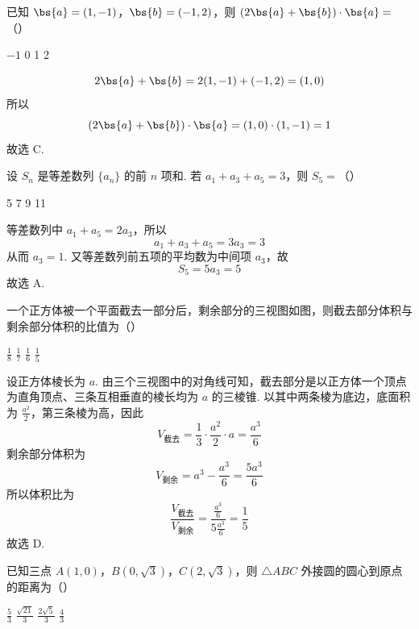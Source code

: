 \begin{problem}
已知 \(\bs{a} = (1, -1)\)，\(\bs{b} = (-1, 2)\)，则 \((2\bs{a} + \bs{b}) \cdot \bs{a} =\)（\quad）

\choices
    {\(-1\)}
    {0}
    {1}
    {2}
\end{problem}


\begin{solution}
\[
2\bs{a}+\bs{b}=2(1,-1)+(-1,2)=(1,0)
\]
所以
\[
(2\bs{a}+\bs{b})\cdot\bs{a}=(1,0)\cdot(1,-1)=1
\]
故选 C.
\end{solution}

\begin{problem}
设 \(S_{n}\) 是等差数列 \(\{a_{n}\}\) 的前 \(n\) 项和. 若 \(a_{1} + a_{3} + a_{5} = 3\)，则 \(S_{5} =\)（\quad）

\choices
    {5}
    {7}
    {9}
    {11}
\end{problem}


\begin{solution}
等差数列中 \(a_{1}+a_{5}=2a_{3}\)，所以
\[
a_{1}+a_{3}+a_{5}=3a_{3}=3
\]
从而 \(a_{3}=1\). 又等差数列前五项的平均数为中间项 \(a_{3}\)，故
\[
S_{5}=5a_{3}=5
\]
故选 A.
\end{solution}

\begin{problem}
一个正方体被一个平面截去一部分后，剩余部分的三视图如图，则截去部分体积与剩余部分体积的比值为（\quad）


\choices
    {\(\frac{1}{8}\)}
    {\(\frac{1}{7}\)}
    {\(\frac{1}{6}\)}
    {\(\frac{1}{5}\)}
\end{problem}


\begin{solution}
设正方体棱长为 \(a\). 由三个三视图中的对角线可知，截去部分是以正方体一个顶点为直角顶点、三条互相垂直的棱长均为 \(a\) 的三棱锥. 以其中两条棱为底边，底面积为 \(\frac{a^{2}}{2}\)，第三条棱为高，因此
\[
V_{\text{截去}}=\frac{1}{3}\cdot\frac{a^{2}}{2}\cdot a=\frac{a^{3}}{6}
\]
剩余部分体积为
\[
V_{\text{剩余}}=a^{3}-\frac{a^{3}}{6}=\frac{5a^{3}}{6}
\]
所以体积比为
\[
\frac{V_{\text{截去}}}{V_{\text{剩余}}}=\frac{\frac{a^{3}}{6}}{5\frac{a^{3}}{6}}=\frac{1}{5}
\]
故选 D.
\end{solution}

\begin{problem}
已知三点 \(A(1,0)\)，\(B(0,\sqrt{3})\)，\(C(2,\sqrt{3})\)，则 \(\triangle ABC\) 外接圆的圆心到原点的距离为（\quad）

\choices
    {\(\frac{5}{3}\)}
    {\(\frac{\sqrt{21}}{3}\)}
    {\(\frac{2\sqrt{5}}{3}\)}
    {\(\frac{4}{3}\)}
\end{problem}


